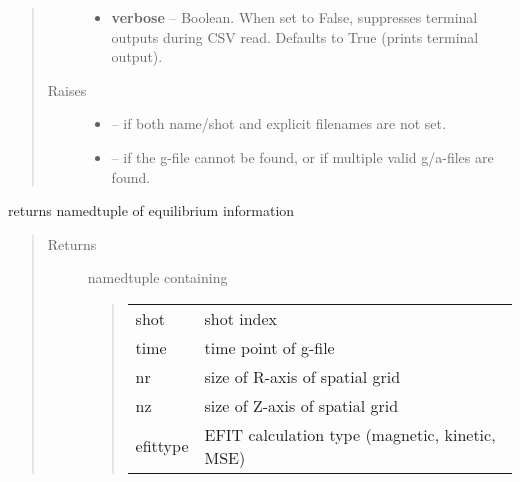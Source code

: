 \documentclass[letterpaper,10pt,english]{sphinxmanual}
\begin{document}
\begin{fulllineitems}
\begin{quote}
\begin{description}
\begin{itemize}
\item {} 
\textbf{verbose} -- Boolean.
When set to False, suppresses terminal outputs during CSV read.
Defaults to True (prints terminal output).

\end{itemize}

\item[{Raises}] \leavevmode\begin{itemize}
\item {} 
 -- if both name/shot and explicit filenames are not set.

\item {} 
 -- if the g-file cannot be found, or if multiple valid g/a-files are found.

\end{itemize}

\end{description}\end{quote}

\begin{fulllineitems}
\label{eqtools:eqtools.eqdskreader.EqdskReader.getInfo}
returns namedtuple of equilibrium information
\begin{quote}\begin{description}
\item[{Returns}] \leavevmode

namedtuple containing
\begin{quote}

\begin{tabulary}{\linewidth}{|L|L|}
\hline

shot
 & 
shot index
\\

time
 & 
time point of g-file
\\

nr
 & 
size of R-axis of spatial grid
\\

nz
 & 
size of Z-axis of spatial grid
\\

efittype
 & 
EFIT calculation type (magnetic, kinetic, MSE)
\\
\hline\end{tabulary}

\end{quote}


\end{description}\end{quote}


\end{fulllineitems}
\end{fulllineitems}
\end{document}

